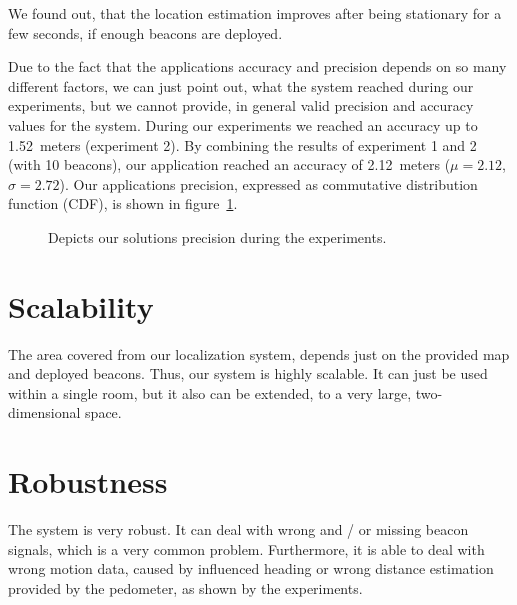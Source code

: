 We found out, that the location estimation improves after being stationary for a few seconds, if enough beacons are deployed.

Due to the fact that the applications accuracy and precision depends on so many different factors, we can just point out, what the system reached during our experiments, but we cannot provide, in general valid precision and accuracy values for the system. During our experiments we reached an accuracy up to 1.52~meters (experiment 2). By combining the results of experiment 1 and 2 (with 10 beacons), our application reached an accuracy of 2.12~meters ($\mu=2.12$, $\sigma=2.72$). Our applications precision, expressed as commutative distribution function (CDF), is shown in figure~\ref{fig:eval:precision}.



\begin{figure}
\caption{Depicts our solutions precision during the experiments.}
\label{fig:eval:precision}
\end{figure}



\section{Scalability}
The area covered from our localization system, depends just on the provided map and deployed beacons. Thus, our system is highly scalable. It can just be used within a single room, but it also can be extended, to a very large, two-dimensional space.

\section{Robustness}
The system is very robust. It can deal with wrong and / or missing beacon signals, which is a very common problem. Furthermore, it is able to deal with wrong motion data, caused by influenced heading or wrong distance estimation provided by the pedometer, as shown by the experiments.

